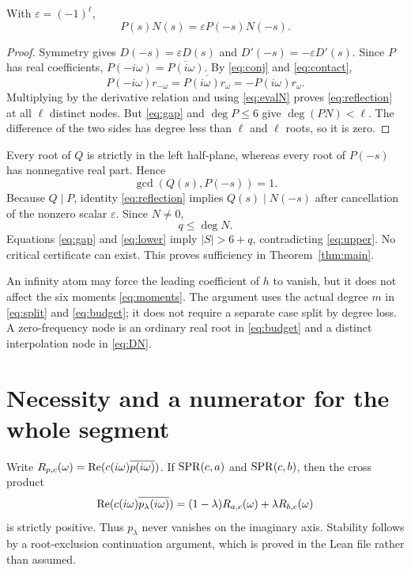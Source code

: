\documentclass[11pt]{article}
\begin{document}
\begin{lemma}\label{lem:reflection}
With $\varepsilon=(-1)^\ell$,
\begin{equation}\label{eq:reflection}
 P(s)N(s)=\varepsilon P(-s)N(-s).
\end{equation}
\end{lemma}
\begin{proof}
Symmetry gives $D(-s)=\varepsilon D(s)$ and $D'(-s)=-\varepsilon D'(s)$. Since $P$ has real coefficients, $P(-i\omega)=\overline{P(i\omega)}$. By \eqref{eq:conj} and \eqref{eq:contact},
\[
 P(-i\omega)r_{-\omega}
 =\overline{P(i\omega)r_\omega}=-P(i\omega)r_\omega.
\]
Multiplying by the derivative relation and using \eqref{eq:evalN} proves \eqref{eq:reflection} at all $\ell$ distinct nodes. But \eqref{eq:gap} and $\deg P\le6$ give $\deg(PN)<\ell$. The difference of the two sides has degree less than $\ell$ and $\ell$ roots, so it is zero.
\end{proof}

Every root of $Q$ is strictly in the left half-plane, whereas every root of $P(-s)$ has nonnegative real part. Hence
\[
 \gcd(Q(s),P(-s))=1.
\]
Because $Q\mid P$, identity \eqref{eq:reflection} implies $Q(s)\mid N(-s)$ after cancellation of the nonzero scalar $\varepsilon$. Since $N\ne0$,
\begin{equation}\label{eq:lower}
 q\le\deg N.
\end{equation}
Equations \eqref{eq:gap} and \eqref{eq:lower} imply $|S|>6+q$, contradicting \eqref{eq:upper}. No critical certificate can exist. This proves sufficiency in Theorem~\ref{thm:main}.

\begin{remark}
An infinity atom may force the leading coefficient of $h$ to vanish, but it does not affect the six moments \eqref{eq:moments}. The argument uses the actual degree $m$ in \eqref{eq:split} and \eqref{eq:budget}; it does not require a separate case split by degree loss. A zero-frequency node is an ordinary real root in \eqref{eq:budget} and a distinct interpolation node in \eqref{eq:DN}.
\end{remark}

\section{Necessity and a numerator for the whole segment}
Write $R_{p,c}(\omega)=\operatorname{Re}(c(i\omega)\overline{p(i\omega)})$. If $\mathrm{SPR}(c,a)$ and $\mathrm{SPR}(c,b)$, then the cross product
\[
 \operatorname{Re}(c(i\omega)\overline{p_\lambda(i\omega)})
 =(1-\lambda)R_{a,c}(\omega)+\lambda R_{b,c}(\omega)
\]
is strictly positive. Thus $p_\lambda$ never vanishes on the imaginary axis. Stability follows by a root-exclusion continuation argument, which is proved in the Lean file rather than assumed.
\end{document}
